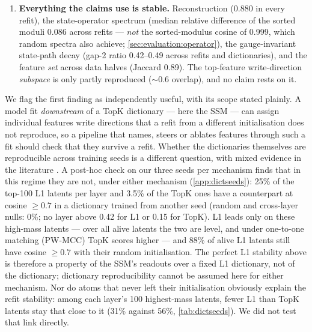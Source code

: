 \begin{enumerate}
    candidate set; the Gate-3 top-100 statistic quoted above is 0.45), so the
    instability is a genuine non-identifiability of the SSM's
    single-feature readout over redundant TopK atoms --- expected
    for a distributed code where the fit only constrains realised
    combinations.
  \item \textbf{Everything the claims use is stable.} Reconstruction (0.880
    in every refit), the state-operator spectrum (median relative difference of
    the sorted moduli 0.086 across refits --- \emph{not} the sorted-modulus
    cosine of 0.999, which random spectra also achieve;
    \cref{sec:evaluation:operator}), the gauge-invariant state-path decay
    (gap-2 ratio 0.42--0.49 across refits and dictionaries), and
    the feature \emph{set} across data halves (Jaccard 0.89). The top-feature
    write-direction \emph{subspace} is only partly reproduced
    ($\sim$0.6 overlap), and no claim rests on it.
\end{enumerate}

We flag the first finding as independently useful, with its scope stated
plainly. A model fit \emph{downstream} of a TopK dictionary --- here the SSM
--- can assign individual features write directions that a refit from a
different initialisation does not reproduce, so a pipeline that names, steers
or ablates features through such a fit should check that they survive a
refit. Whether the dictionaries themselves are reproducible across training
seeds is a different question, with mixed evidence in the literature
\citep{paulo2026seeds,song2026consistency}. A post-hoc check on our three
seeds per mechanism finds that in this regime they are not, under either
mechanism (\cref{app:dictseeds}): 25\% of the top-100 L1 latents per layer
and 3.5\% of the TopK ones have a counterpart at cosine $\ge 0.7$ in a
dictionary trained from another seed (random and cross-layer nulls: 0\%; no
layer above 0.42 for L1 or 0.15 for TopK). L1 leads only on these high-mass
latents --- over all alive latents the two are level, and under one-to-one
matching (PW-MCC) TopK scores higher --- and 88\% of alive L1 latents still
have cosine $\ge 0.7$ with their random initialisation. The perfect L1
stability above is
therefore a property of the SSM's readouts over a fixed L1 dictionary, not
of the dictionary; dictionary reproducibility cannot be assumed here for
either mechanism. Nor do atoms that never left their initialisation
obviously explain the refit stability: among each layer's 100 highest-mass
latents, fewer L1 than TopK latents stay that close to it (31\% against
56\%, \cref{tab:dictseeds}). We did not test that link directly.

